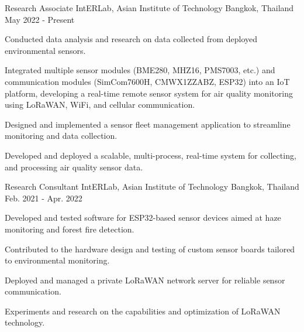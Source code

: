 

\begin{cventries}
\cventry
{Research Associate} %
{IntERLab, Asian Institute of Technology} %
{Bangkok, Thailand} %
{May 2022 - Present} %
{\begin{cvitems} %
		\item {Conducted data analysis and research on data collected from deployed environmental sensors.}
		\item {Integrated multiple sensor modules (BME280, MHZ16, PMS7003, etc.) and communication modules (SimCom7600H, CMWX1ZZABZ, ESP32) into an IoT platform, developing a real-time remote sensor system for air quality monitoring using LoRaWAN, WiFi, and cellular communication.}
		\item {Designed and implemented a sensor fleet management application to streamline monitoring and data collection.}
		\item {Developed and deployed a scalable, multi-process, real-time system for collecting, and processing air quality sensor data.}
\end{cvitems}}

\cventry
{Research Consultant} %
{IntERLab, Asian Institute of Technology} %
{Bangkok, Thailand} %
{Feb. 2021 - Apr. 2022} %
{\begin{cvitems} %
		\item {Developed and tested software for ESP32-based sensor devices aimed at haze monitoring and forest fire detection.}
		\item {Contributed to the hardware design and testing of custom sensor boards tailored to environmental monitoring.}
		\item {Deployed and managed a private LoRaWAN network server for reliable sensor communication.}
		\item {Experiments and research on the capabilities and optimization of LoRaWAN technology.}
\end{cvitems}}


\end{cventries}
